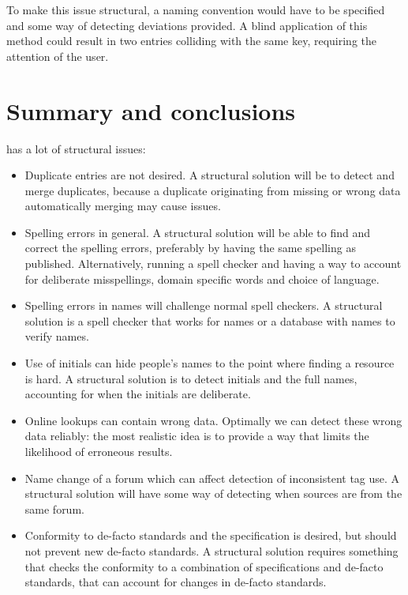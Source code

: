 To make this issue structural, a naming convention would have to be
specified and some way of detecting deviations provided.  A blind
application of this method could result in two entries colliding with
the same key, requiring the attention of the user.


\section{Summary and conclusions}
\label{sec:problems_conclusion}

{\bibtex} has a lot of structural issues:

\begin{itemize}
\item Duplicate entries are not desired.  A structural solution will
  be to detect and merge duplicates, because a duplicate originating
  from missing or wrong data automatically merging may cause issues.

\item Spelling errors in general.  A structural solution will be
  able to find and correct the spelling errors, preferably by having
  the same spelling as published.  Alternatively, running a spell
  checker and having a way to account for deliberate misspellings,
  domain specific words and choice of language.

\item Spelling errors in names will challenge normal spell checkers.
  A structural solution is a spell checker that works for names or a
  database with names to verify names.

\item Use of initials can hide people's names to the point where
  finding a resource is hard.  A structural solution is to detect
  initials and the full names, accounting for when the initials are
  deliberate.

\item Online lookups can contain wrong data.  Optimally we can detect
  these wrong data reliably: the most realistic idea is to provide a
  way that limits the likelihood of erroneous results.

\item Name change of a forum which can affect detection of
  inconsistent tag use.  A structural solution will have some way of
  detecting when sources are from the same forum.

\item Conformity to de-facto standards and the {\bibtex} specification
  is desired, but should not prevent new de-facto standards.  A
  structural solution requires something that checks the conformity to
  a combination of specifications and de-facto standards, that can
  account for changes in de-facto standards.


\end{itemize}
